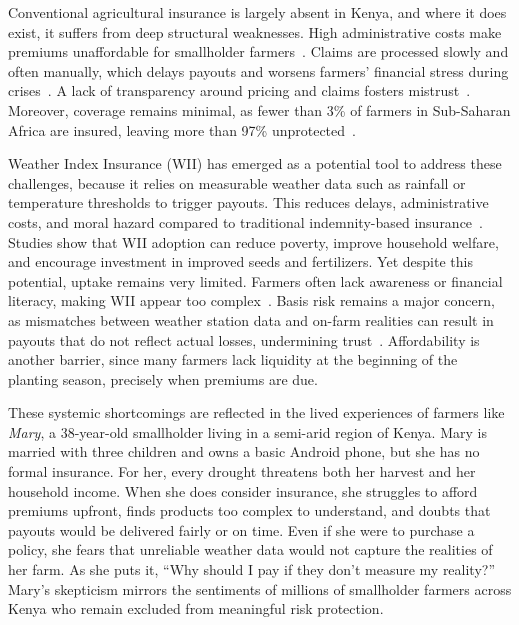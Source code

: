 \documentclass[11pt,a4paper]{article}
\begin{document}
    Conventional agricultural insurance is largely absent in Kenya, and where it does exist, it suffers from deep structural weaknesses.
    High administrative costs make premiums unaffordable for smallholder farmers~\parencite{DominguezAnguianoParte2024}.
    Claims are processed slowly and often manually, which delays payouts and worsens farmers' financial stress during crises~\parencite{Chainlink2021}.
    A lack of transparency around pricing and claims fosters mistrust~\parencite{DominguezAnguianoParte2024}.
    Moreover, coverage remains minimal, as fewer than 3\% of farmers in Sub-Saharan Africa are insured, leaving more than 97\% unprotected~\parencite{WorldBank2022}.

    Weather Index Insurance (WII) has emerged as a potential tool to address these challenges, because it relies on measurable weather data such as rainfall or temperature thresholds to trigger payouts.
    This reduces delays, administrative costs, and moral hazard compared to traditional indemnity-based insurance~\parencite{Jensen2016, Sibiko2018}.
    Studies show that WII adoption can reduce poverty, improve household welfare, and encourage investment in improved seeds and fertilizers.
    Yet despite this potential, uptake remains very limited.
    Farmers often lack awareness or financial literacy, making WII appear too complex~\parencite{Janzen2020}.
    Basis risk remains a major concern, as mismatches between weather station data and on-farm realities can result in payouts that do not reflect actual losses, undermining trust~\parencite{Jensen2016}.
    Affordability is another barrier, since many farmers lack liquidity at the beginning of the planting season, precisely when premiums are due.

    These systemic shortcomings are reflected in the lived experiences of farmers like \textit{Mary}, a 38-year-old smallholder living in a semi-arid region of Kenya.
    Mary is married with three children and owns a basic Android phone, but she has no formal insurance.
    For her, every drought threatens both her harvest and her household income.
    When she does consider insurance, she struggles to afford premiums upfront, finds products too complex to understand, and doubts that payouts would be delivered fairly or on time.
    Even if she were to purchase a policy, she fears that unreliable weather data would not capture the realities of her farm.
    As she puts it, \enquote{Why should I pay if they don't measure my reality?}
    Mary's skepticism mirrors the sentiments of millions of smallholder farmers across Kenya who remain excluded from meaningful risk protection.
\end{document}
